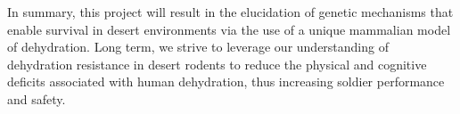 \documentclass[12pt]{article}
\begin{document}
In summary, this project will result in the elucidation of genetic mechanisms that enable survival in desert environments via the use of a unique mammalian model of dehydration. Long term, we strive to leverage our understanding of dehydration resistance in desert rodents to reduce the physical and cognitive deficits associated with human dehydration, thus increasing soldier performance and safety. \\


   
\end{document}
